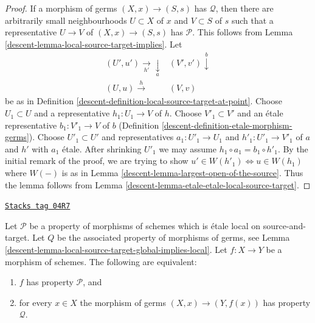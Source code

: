 \begin{proof}

If a morphism of germs $(X, x) \to (S, s)$ has $\mathcal{Q}$,
then there are arbitrarily small neighbourhoods
$U \subset X$ of $x$ and $V \subset S$ of $s$
such that a representative $U \to V$ of $(X, x) \to (S, s)$ has $\mathcal{P}$.
This follows from Lemma \ref{descent-lemma-local-source-target-implies}. Let
$$
\begin{array}{cc}(U', u') \underset{h'}{\longrightarrow}\underset{a}{\downarrow} & (V', v') \overset{b}{\downarrow} \\ (U, u) \overset{h}{\longrightarrow} & (V, v)\end{array}
$$
be as in Definition \ref{descent-definition-local-source-target-at-point}.
Choose $U_1 \subset U$ and a representative $h_1 : U_1 \to V$ of $h$.
Choose $V'_1 \subset V'$ and an \'etale representative $b_1 : V'_1 \to V$
of $b$ (Definition \ref{descent-definition-etale-morphism-germs}).
Choose $U'_1 \subset U'$ and representatives $a_1 : U'_1 \to U_1$
and $h'_1 : U'_1 \to V'_1$ of $a$ and $h'$ with $a_1$ \'etale.
After shrinking $U'_1$ we may assume $h_1 \circ a_1 = b_1 \circ h'_1$.
By the initial remark of the proof, we are trying to show
$u' \in W(h'_1) \Leftrightarrow u \in W(h_1)$ where $W(-)$ is as
in Lemma \ref{descent-lemma-largest-open-of-the-source}.
Thus the lemma follows from Lemma \ref{descent-lemma-etale-etale-local-source-target}.
\end{proof}

\begin{lemma}
\label{descent-lemma-local-source-target-local-implies-global}
\href{https://stacks.math.columbia.edu/tag/04R7}{\texttt{Stacks tag 04R7}}

Let $\mathcal{P}$ be a property of morphisms of schemes which is
\'etale local on source-and-target. Let $Q$ be the associated property
of morphisms of germs, see
Lemma \ref{descent-lemma-local-source-target-global-implies-local}.
Let $f : X \to Y$ be a morphism
of schemes. The following are equivalent:
\begin{enumerate}
\item $f$ has property $\mathcal{P}$, and
\item for every $x \in X$ the morphism of germs $(X, x) \to (Y, f(x))$
has property $\mathcal{Q}$.
\end{enumerate}
\end{lemma}

